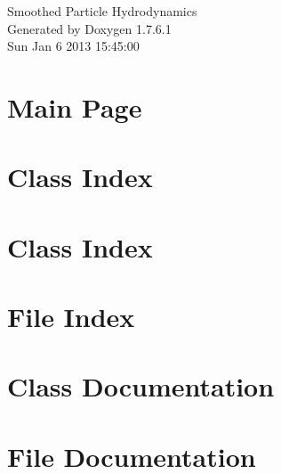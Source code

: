 \documentclass[a4paper]{book}
\begin{document}
\hypersetup{pageanchor=false,citecolor=blue}
\begin{titlepage}
\vspace*{7cm}
\begin{center}
{\Large \-Smoothed \-Particle \-Hydrodynamics }\\
\vspace*{1cm}
{\large \-Generated by Doxygen 1.7.6.1}\\
\vspace*{0.5cm}
{\small Sun Jan 6 2013 15:45:00}\\
\end{center}
\end{titlepage}
\clearemptydoublepage
{}
\tableofcontents
\clearemptydoublepage
{}
\hypersetup{pageanchor=true,citecolor=blue}
\chapter{\-Main \-Page}
\label{index}\hypertarget{index}{}
\chapter{\-Class \-Index}

\chapter{\-Class \-Index}

\chapter{\-File \-Index}

\chapter{\-Class \-Documentation}












\chapter{\-File \-Documentation}




















\printindex
\end{document}
